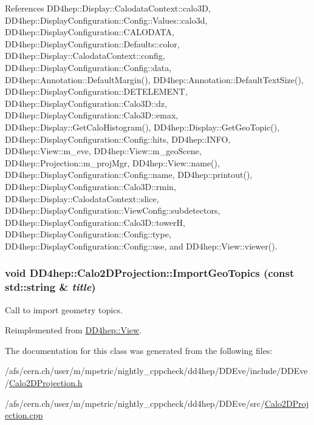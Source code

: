 References DD4hep::Display::CalodataContext::calo3D, DD4hep::DisplayConfiguration::Config::Values::calo3d, DD4hep::DisplayConfiguration::CALODATA, DD4hep::DisplayConfiguration::Defaults::color, DD4hep::Display::CalodataContext::config, DD4hep::DisplayConfiguration::Config::data, DD4hep::Annotation::DefaultMargin(), DD4hep::Annotation::DefaultTextSize(), DD4hep::DisplayConfiguration::DETELEMENT, DD4hep::DisplayConfiguration::Calo3D::dz, DD4hep::DisplayConfiguration::Calo3D::emax, DD4hep::Display::GetCaloHistogram(), DD4hep::Display::GetGeoTopic(), DD4hep::DisplayConfiguration::Config::hits, DD4hep::INFO, DD4hep::View::m\_\-eve, DD4hep::View::m\_\-geoScene, DD4hep::Projection::m\_\-projMgr, DD4hep::View::name(), DD4hep::DisplayConfiguration::Config::name, DD4hep::printout(), DD4hep::DisplayConfiguration::Calo3D::rmin, DD4hep::Display::CalodataContext::slice, DD4hep::DisplayConfiguration::ViewConfig::subdetectors, DD4hep::DisplayConfiguration::Calo3D::towerH, DD4hep::DisplayConfiguration::Config::type, DD4hep::DisplayConfiguration::Config::use, and DD4hep::View::viewer().\hypertarget{class_d_d4hep_1_1_calo2_d_projection_ae4b76bf31fd029d99cece5e9f2df8937}{
\subsubsection[{ImportGeoTopics}]{\setlength{\rightskip}{0pt plus 5cm}void DD4hep::Calo2DProjection::ImportGeoTopics (const std::string \& {\em title})}}
\label{class_d_d4hep_1_1_calo2_d_projection_ae4b76bf31fd029d99cece5e9f2df8937}


Call to import geometry topics. 

Reimplemented from \hyperlink{class_d_d4hep_1_1_view_a2e3e96341bb654afd42e0ae144cecafb}{DD4hep::View}.

The documentation for this class was generated from the following files:\begin{DoxyCompactItemize}
\item 
/afs/cern.ch/user/m/mpetric/nightly\_\-cppcheck/dd4hep/DDEve/include/DDEve/\hyperlink{_calo2_d_projection_8h}{Calo2DProjection.h}\item 
/afs/cern.ch/user/m/mpetric/nightly\_\-cppcheck/dd4hep/DDEve/src/\hyperlink{_calo2_d_projection_8cpp}{Calo2DProjection.cpp}\end{DoxyCompactItemize}
